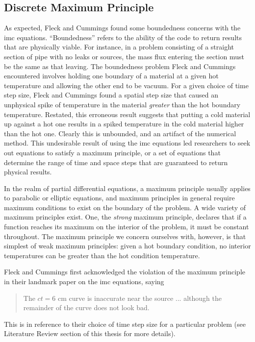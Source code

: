 \subsection{Discrete Maximum Principle}
As expected, Fleck and Cummings found some boundedness concerns with the \gls{imc} equations.  ``Boundedness'' refers to the ability of the code to return results that are physically viable.  For instance, in a problem consisting of a straight section of pipe with no leaks or sources, the mass flux entering the section must be the same as that leaving.  The boundedness problem Fleck and Cummings encountered involves holding one boundary of a material at a given hot temperature and allowing the other end to be vacuum.  For a given choice of time step size, Fleck and Cummings found a spatial step size that caused an unphysical spike of temperature in the material \emph{greater} than the hot boundary temperature.  Restated, this erroneous result suggests that putting a cold material up against a hot one results in a spiked temperature in the cold material higher than the hot one.  Clearly this is unbounded, and an artifact of the numerical method.  This undesirable result of using the \gls{imc} equations led researchers to seek out equations to satisfy a maximum principle, or a set of equations that determine the range of time and space steps that are guaranteed to return physical results.

In the realm of partial differential equations, a maximum principle usually applies to parabolic or elliptic equations, and maximum principles in general require maximum conditions to exist on the boundary of the problem.  A wide variety of maximum principles exist.  One, the \emph{strong} maximum principle, declares that if a function reaches its maximum on the interior of the problem, it must be constant throughout.  The maximum principle we concern ourselves with, however, is that simplest of weak maximum principles: given a hot boundary condition, no interior temperatures can be greater than the hot condition temperature.

Fleck and Cummings first acknowledged the violation of the maximum principle in their landmark paper on the \gls{imc} equations, saying
\begin{quote}
The $ct=6$ cm curve is inaccurate near the source ... although the
remainder of the curve does not look bad. \cite{FleckCumm}
\end{quote}
This is in reference to their choice of time step size for a particular problem (see Literature Review section of this thesis for more details).

